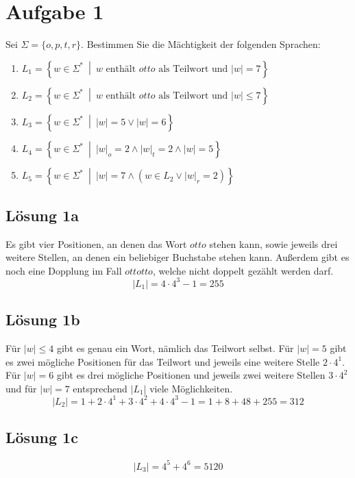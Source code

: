 \documentclass[main.tex]{subfiles}
\begin{document}
\section{Aufgabe 1}

Sei $\Sigma = \{o, p, t, r\}$. Bestimmen Sie die Mächtigkeit der folgenden Sprachen:

\begin{enumerate}
    \item $L_1 = \left\{ w\in \Sigma^*\ \middle|\ w \text{ enthält } otto \text{ als Teilwort und } |w| = 7 \right\}$
    \item $L_2 = \left\{ w\in \Sigma^*\ \middle|\ w \text{ enthält } otto \text{ als Teilwort und } |w|\leq 7 \right\}$
    \item $L_3 = \left\{ w\in \Sigma^*\ \middle|\ |w|=5 \lor |w|=6 \right\}$
    \item $L_4 = \left\{ w\in \Sigma^*\ \middle|\ |w|_o = 2 \land |w|_t = 2 \land |w| = 5 \right\}$
    \item $L_5 = \left\{ w\in \Sigma^*\ \middle|\ |w| = 7 \land \left( w\in L_2 \lor |w|_r = 2\right) \right\}$
\end{enumerate}


\subsection{Lösung 1a}
Es gibt vier Positionen, an denen das Wort $otto$ stehen kann, sowie jeweils drei weitere Stellen, an denen ein beliebiger Buchstabe stehen kann.
Außerdem gibt es noch eine Dopplung im Fall $ottotto$, welche nicht doppelt gezählt werden darf.
$$
    |L_1| = 4\cdot 4^3 - 1 = 255
$$

\subsection{Lösung 1b}
Für $|w|\leq 4$ gibt es genau ein Wort, nämlich das Teilwort selbst.
Für $|w|=5$ gibt es zwei mögliche Positionen für das Teilwort und jeweils eine weitere Stelle $2\cdot 4^1$.
Für $|w|=6$ gibt es drei mögliche Positionen und jeweils zwei weitere Stellen $3\cdot 4^2$ und für $|w|=7$ entsprechend $|L_1|$ viele Möglichkeiten.
$$
    |L_2| = 1 + 2\cdot 4^1 + 3\cdot 4^2 + 4\cdot 4^3 - 1 
          = 1 + 8 + 48 + 255 = 312
$$

\subsection{Lösung 1c}
$$
    |L_3| = 4^5 + 4^6 = 5120
$$
\end{document}
